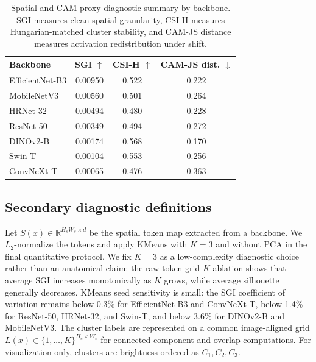 \documentclass[a4paper,fleqn]{els-cas-templates/cas-sc}
\begin{document}
\begin{table}[pos=htbp]
\centering
\caption{Spatial and CAM-proxy diagnostic summary by backbone. SGI measures
clean spatial granularity, CSI-H measures Hungarian-matched cluster stability,
and CAM-JS distance measures activation redistribution under shift.}
\label{tab:spatial_cam_summary}
\small
\begin{tabular}{lccc}
\toprule
Backbone & SGI $\uparrow$ & CSI-H $\uparrow$ & CAM-JS dist. $\downarrow$ \\
\midrule
EfficientNet-B3 & 0.00950 & 0.522 & 0.222 \\
MobileNetV3 & 0.00560 & 0.501 & 0.264 \\
HRNet-32 & 0.00494 & 0.480 & 0.228 \\
ResNet-50 & 0.00349 & 0.494 & 0.272 \\
DINOv2-B & 0.00174 & 0.568 & 0.170 \\
Swin-T & 0.00104 & 0.553 & 0.256 \\
ConvNeXt-T & 0.00065 & 0.476 & 0.363 \\
\bottomrule
\end{tabular}
\end{table}

\subsection{Secondary diagnostic definitions}

Let $S(x)\in\mathbb{R}^{H_sW_s\times d}$ be the spatial token map extracted from
a backbone. We $L_2$-normalize the tokens and apply KMeans \citep{lloyd1982least}
with $K=3$ and without PCA in the final quantitative protocol. We fix $K=3$ as a
low-complexity diagnostic choice rather than an anatomical claim: the raw-token
grid $K$ ablation shows that average SGI increases monotonically as $K$ grows,
while average silhouette generally decreases. KMeans seed sensitivity is small:
the SGI coefficient of variation remains below 0.3\% for EfficientNet-B3 and
ConvNeXt-T, below 1.4\% for ResNet-50, HRNet-32, and Swin-T, and below 3.6\% for
DINOv2-B and MobileNetV3. The cluster labels are represented on a common
image-aligned grid $L(x)\in\{1,\ldots,K\}^{H_c\times W_c}$ for connected-component
and overlap computations. For visualization only, clusters are brightness-ordered
as $C_1,C_2,C_3$.
\end{document}

